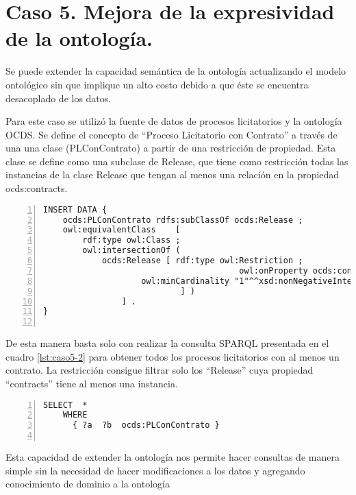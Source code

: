 \section{Caso 5. Mejora de la expresividad de la ontología. }

Se puede extender la capacidad semántica de la ontología actualizando el modelo ontológico sin que implique un alto costo debido a que éste se encuentra desacoplado de los datos.

Para este caso se utilizó la fuente de datos de procesos licitatorios y la ontología OCDS. Se define el concepto de “Proceso Licitatorio con Contrato” a través de una una clase (PLConContrato) a partir de una restricción de propiedad. Esta clase se define como una subclase de Release, que tiene como restricción todas las instancias de la clase Release que tengan al menos una relación en la propiedad ocds:contracts.


\begin{lstlisting}[captionpos=b, caption=Extension de la ontologia utilizando restricciones ontologicas, label={lst:caso5-1},  numbers=left,  numberstyle=\tiny\color{mygray},
    basicstyle=\small,frame=single]
INSERT DATA {
    ocds:PLConContrato rdfs:subClassOf ocds:Release ; 
    owl:equivalentClass    [ 
        rdf:type owl:Class ;
        owl:intersectionOf (   
            ocds:Release [ rdf:type owl:Restriction ;
                                        owl:onProperty ocds:contracts; 
                    owl:minCardinality "1"^^xsd:nonNegativeInteger ;
                            ] )
                ] .
}
    
 \end{lstlisting}

 De esta manera basta solo con realizar la consulta SPARQL presentada en el cuadro \ref{lst:caso5-2} para obtener todos los procesos licitatorios con al menos un contrato. La restricción consigue filtrar solo los “Release” cuya propiedad “contracts” tiene al menos una instancia.

 \begin{lstlisting}[captionpos=b, caption=Consulta SPARQL utilizando la Clase PLConContrato, label=lst:caso5-2,  numbers=left,  numberstyle=\tiny\color{mygray},
    basicstyle=\small,frame=single]
SELECT  *
    WHERE
      { ?a  ?b  ocds:PLConContrato }
    
 \end{lstlisting}

 Esta capacidad de extender la ontología nos permite hacer consultas de manera simple sin la necesidad de hacer modificaciones a los datos y agregando conocimiento de dominio a la ontología